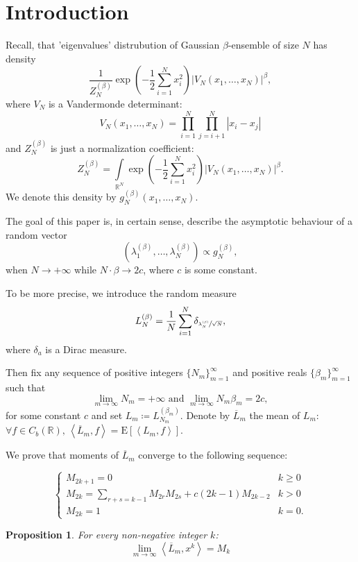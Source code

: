 \documentclass{article}
\newtheorem{proposition}{Proposition}
\newcommand{\apply}[2]{\left\langle#1, #2\right\rangle}
\newcommand{\E}{\mathrm{E}}
\begin{document}
\section{Introduction}
Recall, that 'eigenvalues' distrubution of Gaussian $\beta$-ensemble of size $N$ has density
$$
    	\frac{1}{Z_{N}^{(\beta)}}\exp{\left(-\frac{1}{2}\sum\limits_{i = 1}^{N}x_{i}^2\right)}|V_N(x_1, \ldots, x_N)|^{\beta},
		$$
		where $V_N$ is a Vandermonde determinant:
        $$
            V_N(x_1, \ldots, x_{N}) = \prod\limits_{i = 1}^{N}\prod\limits_{j = i + 1}^{N}|x_i - x_j| 
        $$
        and $Z_{N}^{(\beta)}$ is just a normalization coefficient:
		$$
			Z_{N}^{(\beta)} = 
        \int\limits_{\mathbb{R}^N}\exp{\left(-\frac{1}{2}\sum\limits_{i = 1}^{N}x_{i}^2\right)}|V_N(x_1, \ldots, x_N)|^{\beta}.
		$$
    We denote this density by $g_N^{(\beta)}(x_1, \ldots, x_N)$.

    The goal of this paper is, in certain sense, describe the asymptotic behaviour of a random vector
    $$
        (\lambda_{1}^{(\beta)}, \ldots, \lambda_{N}^{(\beta)}) \propto g_{N}^{(\beta)},
    $$
    when $N \to +\infty$ while $N \cdot \beta \to 2c$, where $c$ is some constant.

    To be more precise, we introduce the random measure
    $$
        L_{N}^{(\beta)} = \frac{1}{N}\sum\limits_{i = 1}^{N}\delta_{\sfrac{\lambda_{N}^{(\beta)}}{\sqrt{N}}},
    $$
    where $\delta_{a}$ is a Dirac measure.

    
    Then fix any sequence of positive integers $\{N_m\}_{m = 1}^{\infty}$ and positive reals $\{\beta_{m}\}_{m = 1}^{\infty}$ such that
    $$
        \lim\limits_{m \to \infty}N_m = +\infty \text{ and } \lim\limits_{m \to \infty}N_m\beta_m = 2c,
    $$
    for some constant $c$ and set $L_m \coloneqq L_{N_m}^{(\beta_m)}$. Denote by $\overline{L}_m$ the mean of $L_m$: $\forall f \in C_{b}(\mathbb{R}), \, \apply{\overline{L}_m}{f} = \E\left[\apply{L_m}{f}\right]$.
    
    We prove that moments of $\overline{L}_m$ converge to the following sequence:

$$
    \begin{cases}
        M_{2k + 1} = 0 & k \geq 0 \\
		M_{2k} = \sum\limits_{r + s = k - 1}M_{2r}M_{2s} + c(2k - 1)M_{2k - 2} & k > 0 \\
		M_{2k} = 1 & k = 0.
	\end{cases}
$$

    \begin{proposition}\label{prop:moments}
    For every non-negative integer $k$:
    $$
    \lim\limits_{m \to \infty}\apply{\overline{L}_m}{x^k} = M_{k}
    $$
    \end{proposition}
\end{document}
